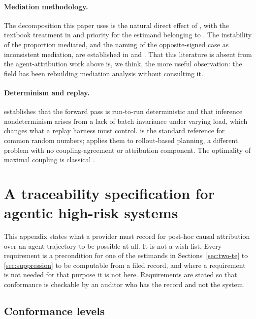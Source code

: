 \documentclass[11pt]{article}
\theoremstyle{remark}
\begin{document}
\paragraph{Mediation methodology.} The decomposition this paper uses is the
natural direct effect of \citet{pearl2001}, with the textbook treatment in
\citet{pearl2009} and priority for the estimand belonging to \citet{robins1992}.
The instability of the proportion mediated, and the naming of the opposite-signed
case as inconsistent mediation, are established in \citet{mackinnon1995} and
\citet{mackinnon2000}. That this literature is absent from the agent-attribution
work above is, we think, the more useful observation: the field has been
rebuilding mediation analysis without consulting it.

\paragraph{Determinism and replay.} \citet{he2025} establishes that the forward
pass is run-to-run deterministic and that inference nondeterminism arises from a
lack of batch invariance under varying load, which changes what a replay harness
must control. \citet{lawkelton2000} is the standard reference for common random
numbers; \citet{yadav2026} applies them to rollout-based planning, a different
problem with no coupling-agreement or attribution component. The optimality of
maximal coupling is classical \citep{levin2017}.




\appendix

\section{A traceability specification for agentic high-risk systems}
\label{app:spec}

This appendix states what a provider must record for post-hoc causal attribution
over an agent trajectory to be possible at all. It is not a wish list. Every
requirement is a precondition for one of the estimands in
Sections~\ref{sec:two-te} to \ref{sec:suppression} to be computable from a filed
record, and where a requirement is not needed for that purpose it is not here.
Requirements are stated so that conformance is checkable by an auditor who has
the record and not the system.

\subsection{Conformance levels}
\end{document}
